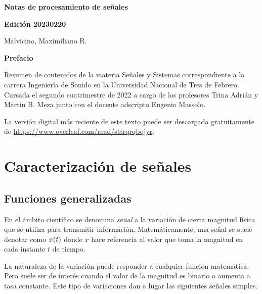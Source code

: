 \documentclass[a5paper,12pt,twoside]{book}
\begin{document}
\pagestyle{fancy}
\fancyhf{}
\chead{\scriptsize \nouppercase\rightmark}
\cfoot{\scriptsize \thepage}
\renewcommand{\headrulewidth}{0pt}

\frontmatter

\begin{center}
    \begin{Huge}
        \textbf{Notas de procesamiento de señales}
    \end{Huge}

    \vspace{1cm}
    \textbf{Edición 20230220}
    \vspace{2cm}

    \begin{Large}
        Malvicino, Maximiliano R.
    \end{Large}
\end{center}

\clearpage
\noindent
\textbf{Prefacio}

Resumen de contenidos de la materia Señales y Sistemas correspondiente a la carrera Ingeniería de Sonido en la Universidad Nacional de Tres de Febrero. Cursada el segundo cuatrimestre de 2022 a cargo de los profesores Trina Adrián y Martín B. Meza junto con el docente adscripto Eugenio Massolo.

La versión digital más reciente de este texto puede ser descargada gratuitamente de \url{https://www.overleaf.com/read/sttrqrqbqjyr}.

\renewcommand{\spanishappendixname}{Anexo}
\tableofcontents

\mainmatter
{}


\chapter{Caracterización de señales}


\section{Funciones generalizadas}

En el ámbito científico se denomina \emph{señal} a la variación de cierta magnitud física que se utiliza para transmitir información. Matemáticamente, una señal se suele denotar como $\fx[x]{t}$ donde $x$ hace referencia al valor que toma la magnitud en cada instante $t$ de tiempo.

La naturaleza de la variación puede responder a cualquier función matemática. Pero suele ser de interés cuando el valor de la magnitud es binario o aumenta a tasa constante. Este tipo de variaciones dan a lugar las siguientes señales simples.
\end{document}
